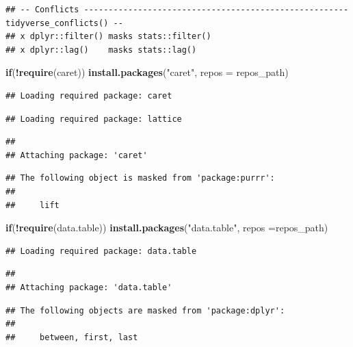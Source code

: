 \documentclass[]{article}
\newenvironment{Shaded}{\begin{snugshade}}{\end{snugshade}}
\newcommand{\ControlFlowTok}[1]{\textcolor[rgb]{0.13,0.29,0.53}{\textbf{#1}}}
\newcommand{\DataTypeTok}[1]{\textcolor[rgb]{0.13,0.29,0.53}{#1}}
\newcommand{\KeywordTok}[1]{\textcolor[rgb]{0.13,0.29,0.53}{\textbf{#1}}}
\newcommand{\NormalTok}[1]{#1}
\newcommand{\OperatorTok}[1]{\textcolor[rgb]{0.81,0.36,0.00}{\textbf{#1}}}
\newcommand{\StringTok}[1]{\textcolor[rgb]{0.31,0.60,0.02}{#1}}
\begin{document}
\begin{verbatim}
## -- Conflicts ------------------------------------------------------ tidyverse_conflicts() --
## x dplyr::filter() masks stats::filter()
## x dplyr::lag()    masks stats::lag()
\end{verbatim}

\begin{Shaded}
\begin{Highlighting}[]
\ControlFlowTok{if}\NormalTok{(}\OperatorTok{!}\KeywordTok{require}\NormalTok{(caret)) }\KeywordTok{install.packages}\NormalTok{(}\StringTok{"caret"}\NormalTok{, }\DataTypeTok{repos =}\NormalTok{ repos_path)}
\end{Highlighting}
\end{Shaded}

\begin{verbatim}
## Loading required package: caret
\end{verbatim}

\begin{verbatim}
## Loading required package: lattice
\end{verbatim}

\begin{verbatim}
## 
## Attaching package: 'caret'
\end{verbatim}

\begin{verbatim}
## The following object is masked from 'package:purrr':
## 
##     lift
\end{verbatim}

\begin{Shaded}
\begin{Highlighting}[]
\ControlFlowTok{if}\NormalTok{(}\OperatorTok{!}\KeywordTok{require}\NormalTok{(data.table)) }\KeywordTok{install.packages}\NormalTok{(}\StringTok{"data.table"}\NormalTok{, }\DataTypeTok{repos =}\NormalTok{repos_path)}
\end{Highlighting}
\end{Shaded}

\begin{verbatim}
## Loading required package: data.table
\end{verbatim}

\begin{verbatim}
## 
## Attaching package: 'data.table'
\end{verbatim}

\begin{verbatim}
## The following objects are masked from 'package:dplyr':
## 
##     between, first, last
\end{verbatim}
\end{document}
